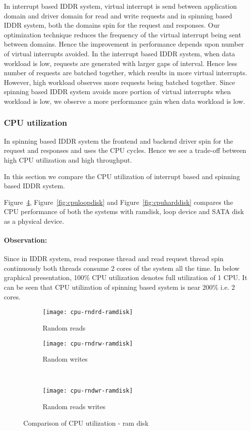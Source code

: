 In interrupt based IDDR system, virtual interrupt is send between application domain and driver domain for read and write requests and in spinning based IDDR system, both the domains spin for the request and responses. Our optimization technique reduces the frequency of the virtual interrupt being sent between domains. Hence the improvement in performance depends upon number of virtual interrupts avoided. In the interrupt based IDDR system, when data workload is low, requests are generated with larger gaps of interval. Hence less number of requests are batched together, which results in more virtual interrupts. However, high workload observes more requests being batched together. Since spinning based IDDR system avoids more portion of virtual interrupts when workload is low, we observe a more performance gain when data workload is low. 

\subsubsection*{CPU utilization}

In spinning based IDDR system the frontend and backend driver spin for the request and responses and uses the CPU cycles. Hence we see a trade-off between high CPU utilization and high throughput. 

In this section we compare the CPU utilization of interrupt based and spinning based IDDR system.

Figure~\ref{fig:cpuramdisk}, Figure~\ref{fig:cpuloopdisk} and Figure~\ref{fig:cpuharddisk} compares the CPU performance of both the systems with ramdisk, loop device and SATA disk as a physical device. 

\paragraph{Observation: }
Since in IDDR system, read response thread and read request thread spin continuously both threads consume 2 cores of the system all the time. In below graphical presentation, 100\% CPU utilization denotes full utilization of 1 CPU. It can be seen that CPU utilization of spinning based system is near 200\% i.e. 2 cores. 

\begin{figure}[!ht]
  \begin{subfigure}[b]{0.2\textwidth}
  \texttt{[image: cpu-rndrd-ramdisk]}
  \caption{Random reads}
  \label{subfig:cpu-rndrd-ramdisk}
  \end{subfigure}
  \hspace{50mm}
  \begin{subfigure}[b]{0.2\textwidth}
  \texttt{[image: cpu-rndrw-ramdisk]}
  \caption{Random writes}
  \label{subfig:cpu-rndrw-ramdisk}
  \end{subfigure}\\
  \begin{subfigure}[b]{0.3\textwidth}
  \texttt{[image: cpu-rndwr-ramdisk]}
  \caption{Random reads writes}
  \label{subfig:cpu-rndwr-ramdisk}
  \end{subfigure}
\caption{Comparison of CPU utilization - ram disk}\label{fig:cpuramdisk}
\end{figure}


